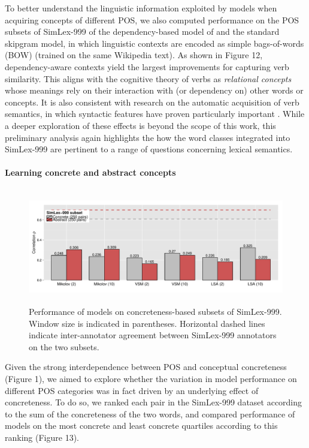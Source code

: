 To better understand the linguistic information exploited by models when acquiring concepts of different POS, we also computed performance on the POS subsets of SimLex-999 of the dependency-based model of \cite{levy2014dependency} and the standard skipgram model, in which linguistic contexts are encoded as simple bags-of-words (BOW) \cite{mikolov2013efficient} (trained on the same Wikipedia text). As shown in Figure 12, dependency-aware contexts yield the largest improvements for capturing verb similarity. This aligns with the cognitive theory of verbs as \emph{relational concepts} \cite{markman1997similar} whose meanings rely on their interaction with (or dependency on) other words or concepts. It is also consistent with research on the automatic acquisition of verb semantics, in which syntactic features have proven particularly important \cite{sun2008verb}.  While a deeper exploration of these effects is beyond the scope of this work, this preliminary analysis again highlights the how the word classes integrated into SimLex-999 are pertinent to a range of questions concerning lexical semantics. 



\paragraph{\bf Learning concrete and abstract concepts}

\begin{figure}[ht]  \includegraphics[width = \textwidth,height=5cm]{Chapter_3/Figure_4_CL}  \caption{Performance of models on concreteness-based subsets of SimLex-999. Window size is indicated in parentheses. Horizontal dashed lines indicate inter-annotator agreement between SimLex-999 annotators on the two subsets.}\end{figure}


Given the strong interdependence between POS and conceptual concreteness (Figure 1), we aimed to explore whether the variation in model performance on different POS categories was in fact driven by an underlying effect of concreteness. To do so, we	 ranked each pair in the SimLex-999 dataset according to the sum of the concreteness of the two words, and compared performance of models on the most concrete and least concrete quartiles according to this ranking (Figure 13). 

